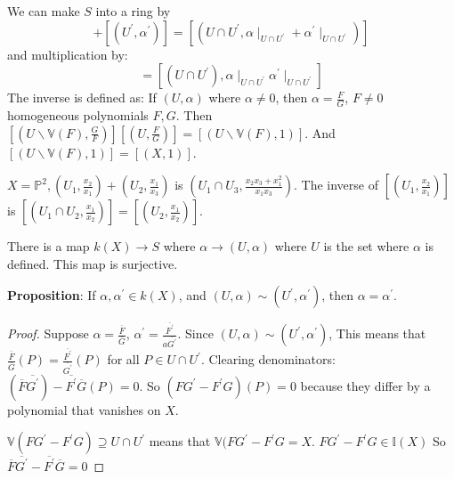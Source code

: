\documentclass{report}
\begin{document}
We can make $S$ into a ring by
    \begin{equation*}
        [(U, \alpha)] + [(U^{\prime}, \alpha^{\prime})] = [(U \cap U^{\prime}, \alpha \mid_{U \cap U^{\prime}} + \alpha^{\prime}\mid_{U \cap U^{\prime}})]
    \end{equation*}
and multiplication by:
    \begin{equation*}
        [(U, \alpha)] [(U^{\prime}, \alpha^{\prime})] = [(U \cap U^{\prime}), \alpha \mid_{U \cap U^{\prime}} \alpha^{\prime}\mid_{U \cap U^{\prime}}]
    \end{equation*}
The inverse is defined as: If $(U, \alpha)$ where $\alpha \neq 0$, then $\alpha = \frac{F}{G}$, $F \neq 0$ homogeneous polynomials $F, G$. Then $[(U \backslash \mathbb{V}(F), \frac{G}{F})] [(U, \frac{F}{G})] = [(U \backslash \mathbb{V}(F), 1)]$. And $[(U \backslash \mathbb{V}(F), 1)] = [(X, 1)]$.
\begin{examples}
    \begin{example}
        $X = \mathbb{P}^{2}, (U_{1}, \frac{x_{2}}{x_{1}}) + (U_{2}, \frac{x_{1}}{x_{3}})$ is $(U_{1} \cap U_{3}, \frac{x_{2}x_{3} + x_{1}^{2}}{x_{1}x_{3}})$. The inverse of $[(U_{1}, \frac{x_{2}}{x_{1}})]$ is $[(U_{1} \cap U_{2}, \frac{x_{1}}{x_{2}})]  = [(U_{2}, \frac{x_{1}}{x_{2}})]$.
    \end{example}
\end{examples}

There is a map $k(X) \rightarrow S$ where $\alpha \rightarrow (U, \alpha)$ where $U$ is the set where $\alpha$ is defined. This map is surjective.

\textbf{Proposition}: If $\alpha, \alpha^{\prime} \in k(X)$, and $(U, \alpha) \sim (U^{\prime}, \alpha^{\prime})$, then $\alpha = \alpha^{\prime}$. 
    \begin{proof}
        Suppose $\alpha = \frac{\overline{F}}{\overline{G}}$, $\alpha^{\prime} = \frac{\overline{F^{\prime}}}{a\overline{G^{\prime}}}$. Since $(U, \alpha) \sim (U^{\prime}, \alpha^{\prime})$, This means that $\frac{\overline{F}}{\overline{G}}(P) = \frac{\overline{F^{\prime}}}{\overline{G^{\prime}}}(P)$ for all $P \in U \cap U^{\prime}$. Clearing denominators: $(\overline{F}\overline{G^{\prime}}) - \overline{F^{\prime}}\overline{G} (P) = 0$. So $(FG^{\prime} - F^{\prime}G)(P) = 0$ because they differ by a polynomial that vanishes on $X$.

        $\mathbb{V}(FG^{\prime} - F^{\prime}G) \supseteq U \cap U^{\prime}$ means that $\mathbb{V}(FG^{\prime} - F^{\prime}G = X$. $FG^{\prime} - F^{\prime}G \in \mathbb{I}(X)$ So $\overline{F}\overline{G^{\prime}} - \overline{F^{\prime}}\overline{G} = 0$
    \end{proof}
\end{document}
